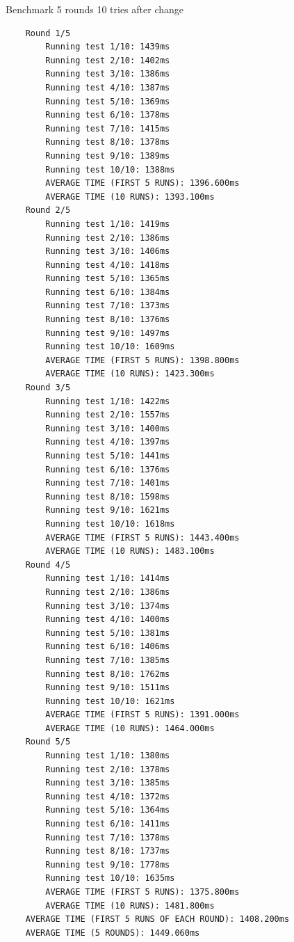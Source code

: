 Benchmark 5 rounds 10 tries after change
\footnotesize\begin{verbatim}
    Round 1/5
        Running test 1/10: 1439ms
        Running test 2/10: 1402ms
        Running test 3/10: 1386ms
        Running test 4/10: 1387ms
        Running test 5/10: 1369ms
        Running test 6/10: 1378ms
        Running test 7/10: 1415ms
        Running test 8/10: 1378ms
        Running test 9/10: 1389ms
        Running test 10/10: 1388ms
        AVERAGE TIME (FIRST 5 RUNS): 1396.600ms
        AVERAGE TIME (10 RUNS): 1393.100ms
    Round 2/5
        Running test 1/10: 1419ms
        Running test 2/10: 1386ms
        Running test 3/10: 1406ms
        Running test 4/10: 1418ms
        Running test 5/10: 1365ms
        Running test 6/10: 1384ms
        Running test 7/10: 1373ms
        Running test 8/10: 1376ms
        Running test 9/10: 1497ms
        Running test 10/10: 1609ms
        AVERAGE TIME (FIRST 5 RUNS): 1398.800ms
        AVERAGE TIME (10 RUNS): 1423.300ms
    Round 3/5
        Running test 1/10: 1422ms
        Running test 2/10: 1557ms
        Running test 3/10: 1400ms
        Running test 4/10: 1397ms
        Running test 5/10: 1441ms
        Running test 6/10: 1376ms
        Running test 7/10: 1401ms
        Running test 8/10: 1598ms
        Running test 9/10: 1621ms
        Running test 10/10: 1618ms
        AVERAGE TIME (FIRST 5 RUNS): 1443.400ms
        AVERAGE TIME (10 RUNS): 1483.100ms
    Round 4/5
        Running test 1/10: 1414ms
        Running test 2/10: 1386ms
        Running test 3/10: 1374ms
        Running test 4/10: 1400ms
        Running test 5/10: 1381ms
        Running test 6/10: 1406ms
        Running test 7/10: 1385ms
        Running test 8/10: 1762ms
        Running test 9/10: 1511ms
        Running test 10/10: 1621ms
        AVERAGE TIME (FIRST 5 RUNS): 1391.000ms
        AVERAGE TIME (10 RUNS): 1464.000ms
    Round 5/5
        Running test 1/10: 1380ms
        Running test 2/10: 1378ms
        Running test 3/10: 1385ms
        Running test 4/10: 1372ms
        Running test 5/10: 1364ms
        Running test 6/10: 1411ms
        Running test 7/10: 1378ms
        Running test 8/10: 1737ms
        Running test 9/10: 1778ms
        Running test 10/10: 1635ms
        AVERAGE TIME (FIRST 5 RUNS): 1375.800ms
        AVERAGE TIME (10 RUNS): 1481.800ms
    AVERAGE TIME (FIRST 5 RUNS OF EACH ROUND): 1408.200ms
    AVERAGE TIME (5 ROUNDS): 1449.060ms
\end{verbatim}
\normalsize

